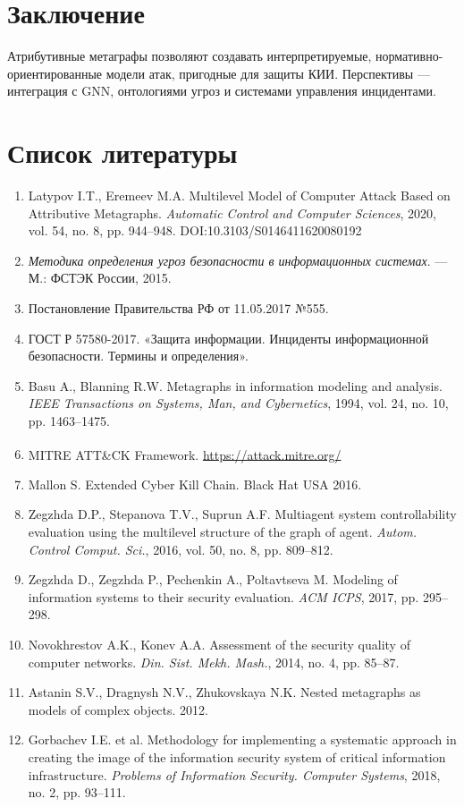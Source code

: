 \documentclass[12pt,a4paper]{article}
\begin{document}
\section*{Заключение}

Атрибутивные метаграфы позволяют создавать интерпретируемые, нормативно-ориентированные модели атак, пригодные для защиты КИИ. Перспективы — интеграция с GNN, онтологиями угроз и системами управления инцидентами.

\section*{Список литературы}

\begin{enumerate}
    \item Latypov I.T., Eremeev M.A. Multilevel Model of Computer Attack Based on Attributive Metagraphs. \textit{Automatic Control and Computer Sciences}, 2020, vol. 54, no. 8, pp. 944–948. DOI:10.3103/S0146411620080192 \label{latypov2020}
    \item \textit{Методика определения угроз безопасности в информационных системах}. — М.: ФСТЭК России, 2015. \label{fsteck2015}
    \item Постановление Правительства РФ от 11.05.2017 №555. \label{post555}
    \item ГОСТ Р 57580-2017. «Защита информации. Инциденты информационной безопасности. Термины и определения». \label{gost57580}
    \item Basu A., Blanning R.W. Metagraphs in information modeling and analysis. \textit{IEEE Transactions on Systems, Man, and Cybernetics}, 1994, vol. 24, no. 10, pp. 1463–1475. \label{basu1994}
    \item MITRE ATT\&CK\textsuperscript{\textregistered} Framework. \url{https://attack.mitre.org/}
    \item Mallon S. Extended Cyber Kill Chain. Black Hat USA 2016.
    \item Zegzhda D.P., Stepanova T.V., Suprun A.F. Multiagent system controllability evaluation using the multilevel structure of the graph of agent. \textit{Autom. Control Comput. Sci.}, 2016, vol. 50, no. 8, pp. 809–812. \label{zegzhda2016}
    \item Zegzhda D., Zegzhda P., Pechenkin A., Poltavtseva M. Modeling of information systems to their security evaluation. \textit{ACM ICPS}, 2017, pp. 295–298. \label{zegzhda2017}
    \item Novokhrestov A.K., Konev A.A. Assessment of the security quality of computer networks. \textit{Din. Sist. Mekh. Mash.}, 2014, no. 4, pp. 85–87. \label{novokhrestov2014}
    \item Astanin S.V., Dragnysh N.V., Zhukovskaya N.K. Nested metagraphs as models of complex objects. 2012.
    \item Gorbachev I.E. et al. Methodology for implementing a systematic approach in creating the image of the information security system of critical information infrastructure. \textit{Problems of Information Security. Computer Systems}, 2018, no. 2, pp. 93–111.
\end{enumerate}
\end{document}
